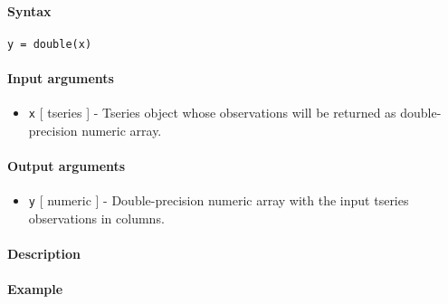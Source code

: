 


	\paragraph{Syntax}\label{syntax}

\begin{verbatim}
y = double(x)
\end{verbatim}

\paragraph{Input arguments}\label{input-arguments}

\begin{itemize}
\itemsep1pt\parskip0pt
\item
  \texttt{x} {[} tseries {]} - Tseries object whose observations will be
  returned as double-precision numeric array.
\end{itemize}

\paragraph{Output arguments}\label{output-arguments}

\begin{itemize}
\itemsep1pt\parskip0pt
\item
  \texttt{y} {[} numeric {]} - Double-precision numeric array with the
  input tseries observations in columns.
\end{itemize}

\paragraph{Description}\label{description}

\paragraph{Example}\label{example}


